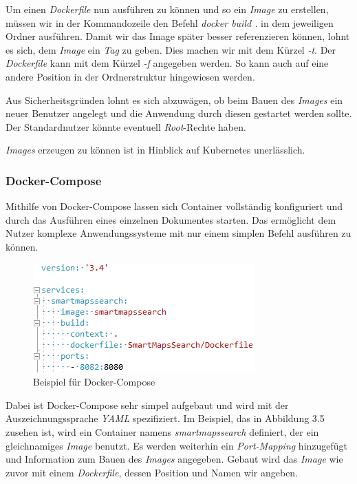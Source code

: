 \documentclass[12pt,a4paper]{scrartcl}
\begin{document}
Um einen \emph{Dockerfile} nun ausführen zu können und so ein \emph{Image} zu erstellen, müssen wir in der Kommandozeile den Befehl \emph{docker build .} in dem jeweiligen Ordner ausführen. Damit wir das Image später besser referenzieren können, lohnt es sich, dem \emph{Image} ein \emph{Tag} zu geben. Dies machen wir mit dem Kürzel \emph{-t}. Der \emph{Dockerfile} kann mit dem Kürzel \emph{-f} angegeben werden. So kann auch auf eine andere Position in der Ordnerstruktur hingewiesen werden.

Aus Sicherheitsgründen lohnt es sich abzuwägen, ob beim Bauen des \emph{Images} ein neuer Benutzer angelegt und die Anwendung durch diesen gestartet werden sollte. Der Standardnutzer könnte eventuell \emph{Root}-Rechte haben.

\emph{Images} erzeugen zu können ist in Hinblick auf Kubernetes unerlässlich.

\subsubsection{Docker-Compose}

Mithilfe von Docker-Compose lassen sich Container vollständig konfiguriert und durch das Ausführen eines einzelnen Dokumentes starten. Das ermöglicht dem Nutzer komplexe Anwendungssysteme mit nur einem simplen Befehl ausführen zu können.\cite{dcoOvr}

\begin{figure}[h!]
	\centering
	\includegraphics[scale=1]{DockerComposeMin.png}
	\caption[Beispiel für Docker-Compose]{Beispiel für Docker-Compose}
\end{figure}

Dabei ist Docker-Compose sehr simpel aufgebaut und wird mit der Auszeichnungssprache \emph{\Gls{YAML}} spezifiziert. Im Beispiel, das in Abbildung 3.5 zusehen ist, wird ein Container namens \emph{smartmapssearch} definiert, der ein gleichnamiges \emph{Image} benutzt. Es werden weiterhin ein \emph{Port-Mapping} hinzugefügt und Information zum Bauen des \emph{Images} angegeben. Gebaut wird das \emph{Image} wie zuvor mit einem \emph{Dockerfile}, dessen Position und Namen wir angeben.\cite{dcoRef}
\end{document}
